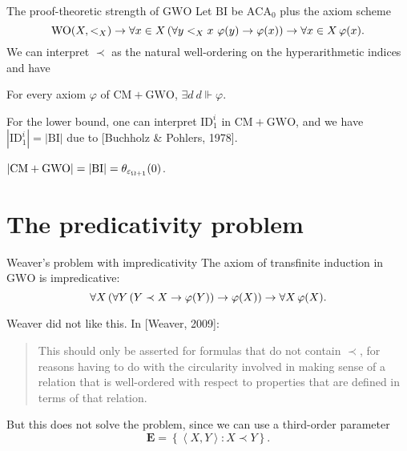 \documentclass{beamer}
\newcommand{\tuple}[1]{\left\langle #1 \right\rangle}
\DeclareMathOperator{\WO}{WO}
\begin{document}
\begin{frame}{The proof-theoretic strength of $\mathrm{GWO}$}
  Let $\mathrm{BI}$ be $\mathrm{ACA}_0$ plus the axiom scheme
  \[\WO\mleft(X, {<_X}\mright) \rightarrow \forall x \in X \left(\forall y <_X x \ \varphi\mleft(y\mright) \rightarrow \varphi\mleft(x\mright)\right) \rightarrow \forall x \in X \, \varphi\mleft(x\mright).\]
  We can interpret $\prec$ as the natural well-ordering on the hyperarithmetic indices and have
  \begin{theorem}[$\mathrm{BI}$]
    For every axiom $\varphi$ of $\mathrm{CM} + \mathrm{GWO}$, $\exists d \ d \Vdash \varphi$.
  \end{theorem}

  \vspace*{8pt}

  For the lower bound, one can interpret $\mathrm{ID}_1^i$ in $\mathrm{CM} + \mathrm{GWO}$, and we have $\left|\mathrm{ID}_1^i\right| = \left|\mathrm{BI}\right|$ due to [Buchholz \& Pohlers, 1978].

  \begin{corollary}
    $\left|\mathrm{CM} + \mathrm{GWO}\right| = \left|\mathrm{BI}\right| = \theta_{\varepsilon_{\Omega + 1}}\mleft(0\mright)$.
  \end{corollary}

  \nocite{buchholz-pohlers78-iterated-id}
\end{frame}

\section[Predicativity]{The predicativity problem}

\begin{frame}{Weaver's problem with impredicativity}
  The axiom of transfinite induction in $\mathrm{GWO}$ is impredicative:
  \[\forall X \left(\forall Y \left(Y \prec X \rightarrow \varphi\mleft(Y\mright)\right) \rightarrow \varphi\mleft(X\mright)\right) \rightarrow \forall X \, \varphi\mleft(X\mright).\]

  Weaver did not like this. In [Weaver, 2009]:
  \begin{quote}
    This should only be asserted for formulas that do not contain $\prec$, for reasons having to do with the circularity involved in making sense of a relation that is well-ordered with respect to properties that are defined in terms of that relation.
  \end{quote}
  But this does not solve the problem, since we can use a third-order parameter
  \[\mathbf{E} = \left\{\tuple{X, Y} : X \prec Y\right\}.\]
\end{frame}
\end{document}
